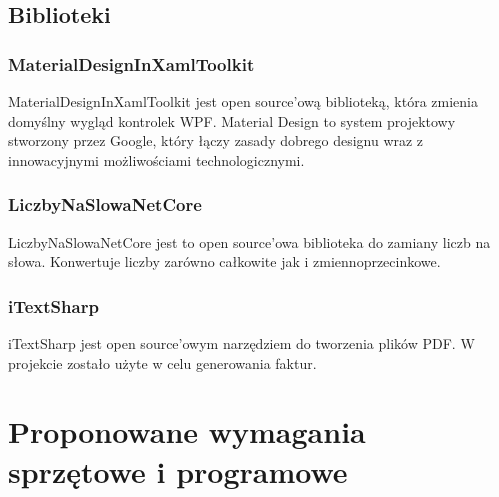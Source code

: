 \subsection{Biblioteki}

\subsubsection{MaterialDesignInXamlToolkit}
MaterialDesignInXamlToolkit \cite{MaterialDesignXAML} jest open source'ową biblioteką, która zmienia domyślny wygląd kontrolek WPF. Material Design to system projektowy stworzony przez Google, który łączy zasady dobrego designu wraz z innowacyjnymi możliwościami technologicznymi.

\subsubsection{LiczbyNaSlowaNetCore}
LiczbyNaSlowaNetCore \cite{LiczbyNaSlowa} jest to open source'owa biblioteka do zamiany liczb na słowa. Konwertuje liczby zarówno całkowite jak i zmiennoprzecinkowe.

\subsubsection{iTextSharp}
iTextSharp \cite{itext} jest open source'owym narzędziem do tworzenia plików PDF. W projekcie zostało użyte w celu generowania faktur.

\section{Proponowane wymagania sprzętowe i programowe}